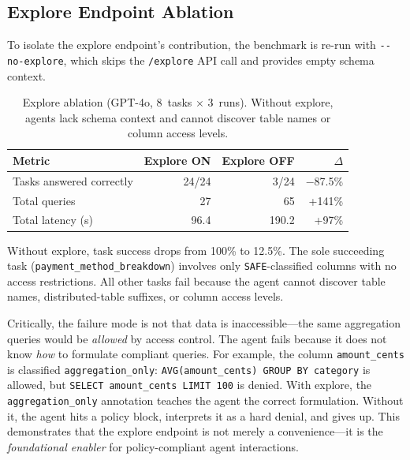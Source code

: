 \documentclass[sigconf, nonacm]{acmart}
\begin{document}
\subsection{Explore Endpoint Ablation}
\label{sec:explore-ablation}

To isolate the explore endpoint's contribution, the benchmark is re-run with
\texttt{-{}-no-explore}, which skips the \texttt{/explore} API call and
provides empty schema context.

\begin{table}[t]
  \centering
  \caption{%
    Explore ablation (GPT-4o, 8~tasks $\times$ 3~runs).
    Without explore, agents lack schema context and cannot discover
    table names or column access levels.
  }
  \label{tab:explore-ablation}
  \begin{tabular}{@{}lrrr@{}}
    \toprule
    \textbf{Metric}
      & \textbf{Explore ON}
      & \textbf{Explore OFF}
      & \textbf{$\Delta$} \\
    \midrule
    Tasks answered correctly & 24/24 & 3/24 & $-$87.5\% \\
    Total queries            & 27    & 65   & +141\% \\
    Total latency (s)        & 96.4  & 190.2 & +97\% \\
    \bottomrule
  \end{tabular}
\end{table}

Without explore, task success drops from 100\% to 12.5\%.  The sole
succeeding task (\texttt{payment\_method\_breakdown}) involves only
\texttt{SAFE}-classified columns with no access restrictions.  All other
tasks fail because the agent cannot discover table names, distributed-table
suffixes, or column access levels.

Critically, the failure mode is not that data is inaccessible---the same
aggregation queries would be \emph{allowed} by access control.  The agent
fails because it does not know \emph{how} to formulate compliant queries.
For example, the column \texttt{amount\_cents} is classified
\texttt{aggregation\_only}: \texttt{AVG(amount\_cents) GROUP BY category}
is allowed, but \texttt{SELECT amount\_cents LIMIT 100} is denied.  With
explore, the \texttt{aggregation\_only} annotation teaches the agent the
correct formulation.  Without it, the agent hits a policy block, interprets
it as a hard denial, and gives up.  This demonstrates that the explore
endpoint is not merely a convenience---it is the \emph{foundational enabler}
for policy-compliant agent interactions.
\end{document}
